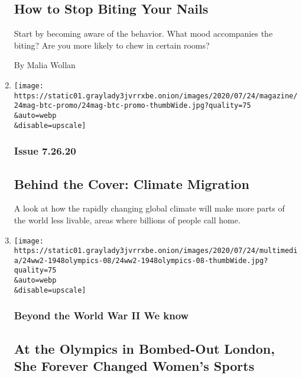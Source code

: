 \begin{enumerate}
  \hypertarget{how-to-stop-biting-your-nails}{%
  \subsection{How to Stop Biting Your
  Nails}\label{how-to-stop-biting-your-nails}}

  Start by becoming aware of the behavior. What mood accompanies the
  biting? Are you more likely to chew in certain rooms?

  By Malia Wollan
\item
  \href{/2020/07/24/magazine/behind-the-cover-climate-migration.html}{}

  \texttt{[image: https://static01.graylady3jvrrxbe.onion/images/2020/07/24/magazine/24mag-btc-promo/24mag-btc-promo-thumbWide.jpg?quality=75\\\&auto=webp\\\&disable=upscale]}

  \hypertarget{issue-72620}{%
  \subsubsection{Issue 7.26.20}\label{issue-72620}}

  \hypertarget{behind-the-cover-climate-migration}{%
  \subsection{Behind the Cover: Climate
  Migration}\label{behind-the-cover-climate-migration}}

  A look at how the rapidly changing global climate will make more parts
  of the world less livable, areas where billions of people call home.
\item
  \href{/2020/07/24/magazine/1948-olympics-fanny-blankers-koen.html}{}

  \texttt{[image: https://static01.graylady3jvrrxbe.onion/images/2020/07/24/multimedia/24ww2-1948olympics-08/24ww2-1948olympics-08-thumbWide.jpg?quality=75\\\&auto=webp\\\&disable=upscale]}

  \hypertarget{beyond-the-world-war-ii-we-know-1}{%
  \subsubsection{Beyond the World War II We
  know}\label{beyond-the-world-war-ii-we-know-1}}

  \hypertarget{at-the-olympics-in-bombed-out-london-she-forever-changed-womens-sports}{%
  \subsection{At the Olympics in Bombed-Out London, She Forever Changed
  Women's
  Sports}\label{at-the-olympics-in-bombed-out-london-she-forever-changed-womens-sports}}


\end{enumerate}
